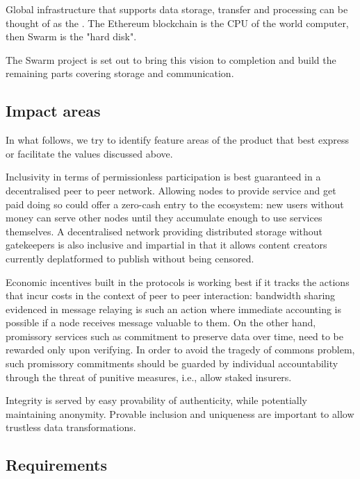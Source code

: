 Global infrastructure that supports data storage, transfer and processing 
can be thought of as the . The Ethereum blockchain is the CPU of the world computer, then Swarm is the "hard disk".

The Swarm project is set out to bring this vision to completion and build the remaining parts covering storage and communication. 

\subsection{Impact areas}

In what follows, we try to identify feature areas of the product that best express or facilitate the values discussed above. 

Inclusivity in terms of permissionless participation is best guaranteed in a decentralised peer to peer network.  
Allowing nodes to provide service and get paid doing so could offer a zero-cash entry to the ecosystem: new users without money can serve other nodes until they accumulate enough to use services themselves. A decentralised network providing distributed storage without gatekeepers is also inclusive and impartial in that it allows content creators currently deplatformed to publish without being censored. 

Economic incentives built in the protocols is working best if it tracks the actions that incur costs in the context of peer to peer interaction: bandwidth sharing evidenced in message relaying is such an action where immediate accounting is possible if a node receives message valuable to them. On the other hand, promissory services such as commitment to preserve data over time, need to be rewarded only upon verifying. In order to avoid the tragedy of commons problem, such promissory commitments should be guarded by individual accountability through the threat of punitive measures, i.e., allow staked insurers.

Integrity is served by easy provability of authenticity, while potentially maintaining anonymity.
Provable inclusion and uniqueness are important to allow trustless data transformations.


\subsection{Requirements}\label{sec:requirements}




